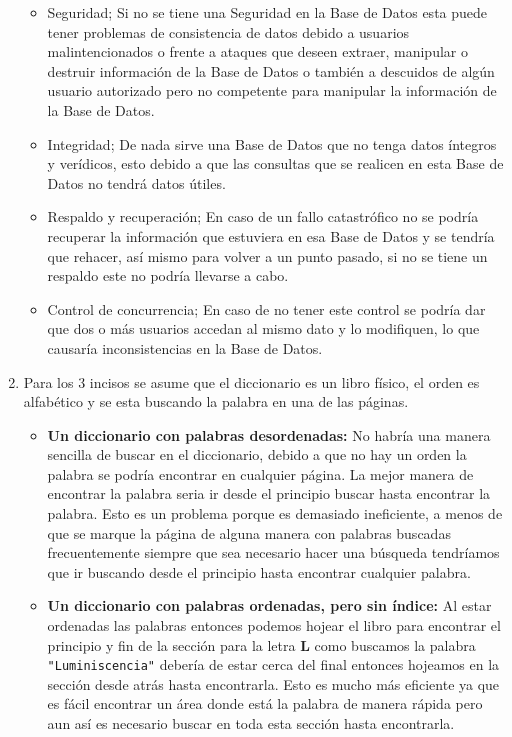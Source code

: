 \documentclass{exam}
\begin{document}
\begin{questions}
\begin{enumerate}[label=\alph*.]
\begin{itemize}
		        \item Seguridad; Si no se tiene una Seguridad en la Base de Datos esta puede tener problemas de consistencia de datos debido a usuarios malintencionados o frente a ataques que deseen extraer, manipular o destruir información de la Base de Datos o también a descuidos de algún usuario autorizado pero no competente para manipular la información de la Base de Datos.
		        \item Integridad; De nada sirve una Base de Datos que no tenga datos íntegros y verídicos, esto debido a que las consultas que se realicen en esta Base de Datos no tendrá datos útiles.
		        \item Respaldo y recuperación; En caso de un fallo catastrófico no se podría recuperar la información que estuviera en esa Base de Datos y se tendría que rehacer, así mismo para volver a un punto pasado, si no se tiene un respaldo este no podría llevarse a cabo.
		        \item Control de concurrencia; En caso de no tener este control se podría dar que dos o más usuarios accedan al mismo dato y lo modifiquen, lo que causaría inconsistencias en la Base de Datos.
		    \end{itemize}
		\item Para los 3 incisos se asume que el diccionario es un libro físico, el orden es alfabético y se esta buscando la palabra en una de las páginas.
		\begin{itemize}
			\item \textbf{Un diccionario con palabras desordenadas: }No habría una manera sencilla de buscar en el diccionario, debido a que no hay un orden la palabra se podría encontrar en cualquier página. La mejor manera de encontrar la palabra seria ir desde el principio buscar hasta encontrar la palabra. Esto es un problema porque es demasiado ineficiente, a menos de que se marque la página de alguna manera con palabras buscadas frecuentemente siempre que sea necesario hacer una búsqueda tendríamos que ir buscando desde el principio hasta encontrar cualquier palabra.
			\item \textbf{Un diccionario con palabras ordenadas, pero sin índice: }Al estar ordenadas las palabras entonces podemos hojear el libro  para encontrar el principio y fin de la sección para la letra \textbf{L} como buscamos la palabra \texttt{"Luminiscencia"} debería de estar cerca del final entonces hojeamos en la sección desde atrás hasta encontrarla. Esto es mucho más eficiente ya que es fácil encontrar un área donde está la palabra de manera rápida pero aun así es necesario buscar en toda esta sección hasta encontrarla.

\end{itemize}
\end{enumerate}
\end{questions}
\end{document}
